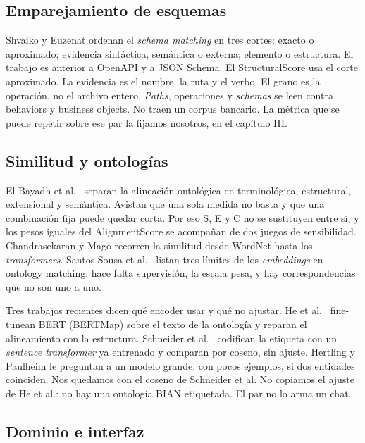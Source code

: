 \subsection{Emparejamiento de esquemas}

Shvaiko y Euzenat \cite{Shvaiko2005} ordenan el \textit{schema matching} en tres cortes: exacto o aproximado; evidencia sintáctica, semántica o externa; elemento o estructura. El trabajo es anterior a OpenAPI y a JSON Schema. El StructuralScore usa el corte aproximado. La evidencia es el nombre, la ruta y el verbo. El grano es la operación, no el archivo entero. \textit{Paths}, operaciones y \textit{schemas} se leen contra behaviors y business objects. No traen un corpus bancario. La métrica que se puede repetir sobre ese par la fijamos nosotros, en el capítulo III.

\subsection{Similitud y ontologías}

El Bayadh et al.\ \cite{ElBayadh2015} separan la alineación ontológica en terminológica, estructural, extensional y semántica. Avistan que una sola medida no basta y que una combinación fija puede quedar corta. Por eso S, E y C no se sustituyen entre sí, y los pesos iguales del AlignmentScore se acompañan de dos juegos de sensibilidad. Chandrasekaran y Mago \cite{Chandrasekaran2022} recorren la similitud desde WordNet hasta los \textit{transformers}. Santos Sousa et al.\ \cite{SantosSousa2026} listan tres límites de los \textit{embeddings} en ontology matching: hace falta supervisión, la escala pesa, y hay correspondencias que no son uno a uno.

Tres trabajos recientes dicen qué encoder usar y qué no ajustar. He et al.\ \cite{He2022} fine-tunean BERT (BERTMap) sobre el texto de la ontología y reparan el alineamiento con la estructura. Schneider et al.\ \cite{Schneider2023} codifican la etiqueta con un \textit{sentence transformer} ya entrenado y comparan por coseno, sin ajuste. Hertling y Paulheim \cite{Hertling2023} le preguntan a un modelo grande, con pocos ejemplos, si dos entidades coinciden. Nos quedamos con el coseno de Schneider et al. No copiamos el ajuste de He et al.: no hay una ontología BIAN etiquetada. El par no lo arma un chat.

\subsection{Dominio e interfaz}

